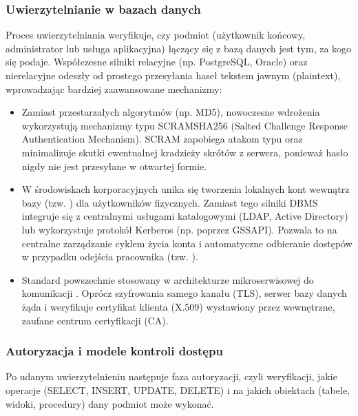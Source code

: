 \documentclass[a4paper,11pt,english,openany,oneside]{sphinxmanual}
\begin{document}
\subsubsection{Uwierzytelnianie w bazach danych}
\label{\detokenize{rozdzial_2/rozdzial_27/rozdzial_3:uwierzytelnianie-w-bazach-danych}}
\sphinxAtStartPar
Proces uwierzytelniania weryfikuje, czy podmiot (użytkownik końcowy, administrator lub usługa aplikacyjna) łączący się z bazą danych jest tym, za kogo się podaje. Współczesne silniki relacyjne (np. PostgreSQL, Oracle) oraz nierelacyjne odeszły od prostego przesyłania haseł tekstem jawnym (plaintext), wprowadzając bardziej zaawansowane mechanizmy:
\begin{itemize}
\item {} 
\sphinxAtStartPar
{} Zamiast przestarzałych algorytmów (np. MD5), nowoczesne wdrożenia wykorzystują mechanizmy typu SCRAM\sphinxhyphen{}SHA\sphinxhyphen{}256 (Salted Challenge Response Authentication Mechanism). SCRAM zapobiega atakom typu  oraz minimalizuje skutki ewentualnej kradzieży skrótów z serwera, ponieważ hasło nigdy nie jest przesyłane w otwartej formie.

\item {} 
\sphinxAtStartPar
{} W środowiskach korporacyjnych unika się tworzenia lokalnych kont wewnątrz bazy (tzw. ) dla użytkowników fizycznych. Zamiast tego silniki DBMS integruje się z centralnymi usługami katalogowymi (LDAP, Active Directory) lub wykorzystuje protokół Kerberos (np. poprzez GSSAPI). Pozwala to na centralne zarządzanie cyklem życia konta i automatyczne odbieranie dostępów w przypadku odejścia pracownika (tzw. ).

\item {} 
\sphinxAtStartPar
{} Standard powszechnie stosowany w architekturze mikroserwisowej do komunikacji . Oprócz szyfrowania samego kanału (TLS), serwer bazy danych żąda i weryfikuje certyfikat klienta (X.509) wystawiony przez wewnętrzne, zaufane centrum certyfikacji (CA).

\end{itemize}


\subsubsection{Autoryzacja i modele kontroli dostępu}
\label{\detokenize{rozdzial_2/rozdzial_27/rozdzial_3:autoryzacja-i-modele-kontroli-dostepu}}
\sphinxAtStartPar
Po udanym uwierzytelnieniu następuje faza autoryzacji, czyli weryfikacji, jakie operacje (SELECT, INSERT, UPDATE, DELETE) i na jakich obiektach (tabele, widoki, procedury) dany podmiot może wykonać.
\end{document}
